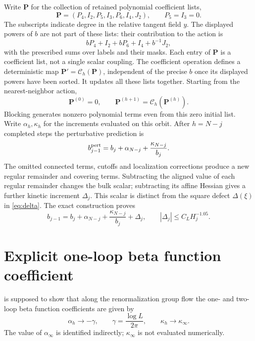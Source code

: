 \documentclass[11pt]{article}
\numberwithin{equation}{section}
\theoremstyle{definition}
\theoremstyle{plain}
\begin{document}
Write $\mathbf P$ for the collection of retained polynomial
coefficient lists,
\begin{equation}
 \mathbf P=(P_4,I_2,P_5,I_3,P_6,I_4,J_2),
 \qquad P_5=I_3=0.
\end{equation}
The subscripts indicate degree in the relative tangent field $y$.
The displayed powers of $b$ are not part of these lists: their
contribution to the action is
\begin{equation}
 bP_4+I_2+bP_6+I_4+b^{-1}J_2,
\end{equation}
with the prescribed sums over labels and their masks.  Each entry
of $\mathbf P$ is a coefficient list, not a single scalar coupling.
The coefficient operation defines a deterministic map
$\mathbf P'=\mathcal C_h(\mathbf P)$, independent of the precise
$b$ once its displayed powers have been sorted.  It updates all
these lists together.  Starting from the nearest-neighbor action,
\begin{equation}
 \mathbf P^{(0)}=0,\qquad
 \mathbf P^{(h+1)}=\mathcal C_h(\mathbf P^{(h)}).
\end{equation}
Blocking generates nonzero polynomial terms even from this zero
initial list.
Write $\alpha_h,\kappa_h$ for the increments evaluated on this orbit.
After $h=N-j$ completed steps the perturbative prediction is
\begin{equation}
 b_{j-1}^{\rm pert}=b_j+\alpha_{N-j}+\frac{\kappa_{N-j}}{b_j}.
\end{equation}
The omitted connected terms, cutoffs and localization corrections
produce a new regular remainder and covering terms.  Subtracting
the aligned value of each regular remainder changes the bulk
scalar; subtracting its affine Hessian gives a further kinetic
increment $\Delta_j$.  This scalar is distinct from the square
defect $\Delta(\xi)$ in \eqref{eq:delta}.  The exact construction proves
\begin{equation}
 b_{j-1}=b_j+\alpha_{N-j}+\frac{\kappa_{N-j}}{b_j}+\Delta_j,
 \qquad |\Delta_j|\le C_LH_j^{-1.05}.
 \label{eq:pert-exact-recursion}
\end{equation}

\newpage
\section{Explicit one-loop beta function coefficient}
\label{sec:explicit-alpha}

\cite[Section~6.1]{OpenAI-O3} is supposed to show that along the renormalization group flow
the one- and two-loop beta function coefficients are given by
\begin{equation}
 \alpha_h\longrightarrow-\gamma,
 \qquad \gamma=\frac{\log L}{2\pi},\qquad
 \kappa_h\longrightarrow\kappa_\infty.
\end{equation}
The value of $\alpha_\infty$ is identified indirectly;
$\kappa_\infty$ is not evaluated numerically.
\end{document}

